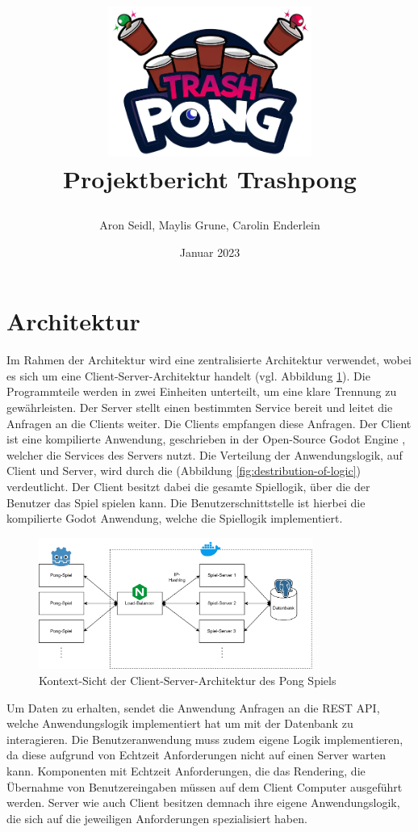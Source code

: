 \documentclass[
]{article}
\title{
  \begin{center}
    \includegraphics[width=0.5\textwidth]{resources/header.png} \\
    Projektbericht Trashpong
  \end{center}
}
\author{Aron Seidl, Maylis Grune, Carolin Enderlein}
\date{Januar 2023}
\begin{document}
\maketitle

\hypertarget{section-introduction-and-goals}{%
\section{Architektur}\label{section-introduction-and-goals}}

Im Rahmen der Architektur wird eine zentralisierte Architektur verwendet, wobei es sich um eine Client-Server-Architektur handelt (vgl. Abbildung \ref{fig:clientserver}).
Die Programmteile werden in zwei Einheiten unterteilt, um eine klare Trennung zu gewährleisten. 
Der Server stellt einen bestimmten Service bereit und leitet die Anfragen an die Clients weiter. 
Die Clients empfangen diese Anfragen.\cite{tanenbaum2007distributed}
Der Client ist eine kompilierte Anwendung, geschrieben in der Open-Source Godot Engine \cite{godot}, welcher die
Services des Servers nutzt. 
Die Verteilung der Anwendungslogik, auf Client und Server, wird durch die (Abbildung \ref{fig:destribution-of-logic}) verdeutlicht.
Der Client besitzt dabei die gesamte Spiellogik, über die der Benutzer das Spiel spielen kann. 
Die Benutzerschnittstelle ist hierbei die kompilierte Godot Anwendung, welche die Spiellogik implementiert.

\begin{figure}[H]
	\centering
	\includegraphics[width=0.8\textwidth ]{resources/Client-Server.drawio.png}
	\caption{Kontext-Sicht der Client-Server-Architektur des Pong Spiels}
	\label{fig:clientserver}
\end{figure}

Um Daten zu erhalten, sendet die Anwendung Anfragen an die REST API, welche Anwendungslogik implementiert hat um mit der Datenbank zu interagieren.
Die Benutzeranwendung muss zudem eigene Logik implementieren, da diese aufgrund von Echtzeit Anforderungen nicht auf einen Server warten kann.
Komponenten mit Echtzeit Anforderungen, die das  Rendering, die Übernahme von Benutzereingaben müssen auf dem Client Computer ausgeführt werden.
Server wie auch Client besitzen demnach ihre eigene Anwendungslogik, die sich auf die jeweiligen Anforderungen spezialisiert haben.
\end{document}
